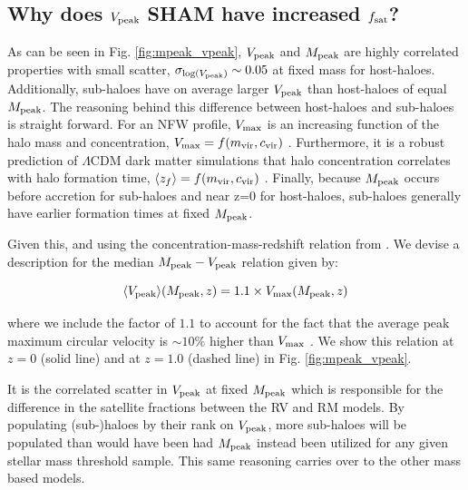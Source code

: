 \documentclass[a4paper,fleqn,usenatbib]{mnras}
\begin{document}
\subsection{Why does $V_{\rm peak}$ SHAM have increased $f_{\rm sat}$?}

As can be seen in Fig. \ref{fig:mpeak_vpeak}, $V_{\rm peak}$ and $M_{\rm peak}$ are highly correlated properties with small scatter, $\sigma_{\log(V_{\rm peak})}\sim 0.05$ at fixed mass for host-haloes.  Additionally, sub-haloes have on average larger $V_{\rm peak}$ than host-haloes of equal $M_{\rm peak}$.  The reasoning behind this difference between host-haloes and sub-haloes is straight forward.  For an NFW profile, $V_{\rm max}$ is an increasing function of the halo mass and concentration, $V_{\rm max} = f(m_{\rm vir}, c_{\rm vir})$ \citep[see eq. 6 in][]{Bosch:2014cu}. Furthermore, it is a robust prediction of $\Lambda$CDM dark matter simulations that halo concentration correlates with halo formation time, $\langle z_f \rangle = f(m_{\rm vir}, c_{\rm vir})$ \citep[e.g.][]{Wechsler:2002kh}.  Finally, because $M_{\rm peak}$ occurs before accretion for sub-haloes and near z=0 for host-haloes, sub-haloes generally have earlier formation times at fixed $M_{\rm peak}$.   

Given this, and using the concentration-mass-redshift relation from \citet{Maccio:2009bs}.  We devise a description for the median $M_{\rm peak}-V_{\rm peak}$ relation given by:
%
\begin{linenomath}
\begin{equation}
\label{eq:vpeak}
\langle V_{\rm peak}\rangle (M_{\rm peak}, z) = 1.1\times V_{\rm max}(M_{\rm peak}, z)
\end{equation}
\end{linenomath}
%
where we include the factor of $1.1$ to account for the fact that the average peak maximum circular velocity is $\sim 10\%$ higher than $V_{\rm max}$ \citep{Behroozi:2014kk}.  We show this relation at $z=0$ (solid line) and at $z=1.0$ (dashed line) in Fig. \ref{fig:mpeak_vpeak}. 

It is the correlated scatter in $V_{\rm peak}$ at fixed $M_{\rm peak}$ which is responsible for the difference in the satellite fractions between the RV and RM models.  By populating (sub-)haloes by their rank on $V_{\rm peak}$, more sub-haloes will be populated than would have been had $M_{\rm peak}$ instead been utilized for any given stellar mass threshold sample.  This same reasoning carries over to the other mass based models.  
\end{document}
